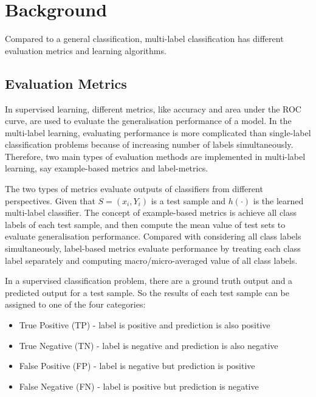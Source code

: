 
\chapter{Background} %
\label{Chapter6}

Compared to a general classification, multi-label classification has different evaluation metrics and learning algorithms.

\section{Evaluation Metrics}

In supervised learning, different metrics, like accuracy and area under the ROC curve, are used to evaluate the generalisation performance of a model. In the multi-label learning, evaluating performance is more complicated  than single-label classification problems because of increasing number of labels simultaneously. Therefore, two main types of evaluation methods are implemented in multi-label learning, say example-based metrics\citep{ghamrawi2005collective} and label-metrics\citep{tsoumakas2007random}.

The two types of metrics evaluate outputs of classifiers from different perspectives. Given that $S = {(x_{i}, Y_{i})}$ is a test sample and $h(\cdot)$ is the learned multi-label classifier. The concept of example-based metrics is achieve all class labels of each test sample, and then compute the mean value of test sets to evaluate generalisation performance. Compared with considering all class labels simultaneously, label-based metrics evaluate performance by treating each class label separately and computing macro/micro-averaged value of all class labels.

In a supervised classification problem, there are a ground truth output and a predicted output for a test sample. So the results of each test sample can be assigned to one of the four categories:
\begin{itemize}
\item True Positive (TP) - label is positive and prediction is also positive
\item True Negative (TN) - label is negative and prediction is also negative
\item False Positive (FP) - label is negative but prediction is positive
\item False Negative (FN) - label is positive but prediction is negative
\end{itemize}

